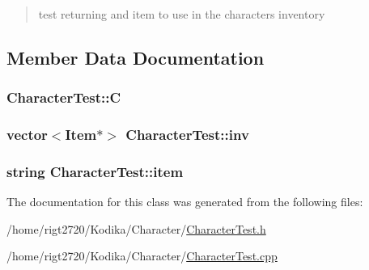 \begin{quotation}
test returning and item to use in the characters inventory \end{quotation}




\subsection{Member Data Documentation}
\hypertarget{classCharacterTest_a2afd29afdeb90cbac6ac18a71ef7e23a}{
\subsubsection[{C}]{ Character\-Test\-::\-C\hspace{0.3cm}{\ttfamily [private]}}}\label{classCharacterTest_a2afd29afdeb90cbac6ac18a71ef7e23a}
\hypertarget{classCharacterTest_a23af9da0d443fb16273ed269b8a91e8b}{
\subsubsection[{inv}]{\setlength{\rightskip}{0pt plus 5cm}vector$<${\bf Item}$\ast$$>$ Character\-Test\-::inv\hspace{0.3cm}{\ttfamily [private]}}}\label{classCharacterTest_a23af9da0d443fb16273ed269b8a91e8b}
\hypertarget{classCharacterTest_aee8b109b66e2f22ba5de6abaaba47160}{
\subsubsection[{item}]{\setlength{\rightskip}{0pt plus 5cm}string Character\-Test\-::item\hspace{0.3cm}{\ttfamily [private]}}}\label{classCharacterTest_aee8b109b66e2f22ba5de6abaaba47160}


The documentation for this class was generated from the following files\-:\begin{DoxyCompactItemize}
\item 
/home/rigt2720/\-Kodika/\-Character/\hyperlink{CharacterTest_8h}{Character\-Test.\-h}\item 
/home/rigt2720/\-Kodika/\-Character/\hyperlink{CharacterTest_8cpp}{Character\-Test.\-cpp}\end{DoxyCompactItemize}

